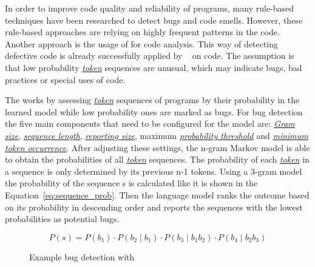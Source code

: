 In order to improve code quality and reliability of programs, many rule-based techniques have been researched to detect bugs and code smells. However, these rule-based approaches are relying on highly frequent patterns in the code. Another approach is the usage of  for code analysis. This way of detecting defective code is already successfully applied by \bugram{}~\cite{bugram} on \java{} code. The assumption is that low probability \hyperref[def:token]{\textit{token}} sequences are unusual, which may indicate bugs, bad practices or special uses of code. 

The \ngram{} works by assessing \hyperref[def:token]{\textit{token}} sequences of programs by their probability in the learned model while low probability ones are marked as bugs. For bug detection the five main components that need to be configured for the model are: \hyperref[def:gram_size]{\textit{Gram size}}, \hyperref[def:sequence_length]{\textit{sequence length}}, \hyperref[def:reporting_size]{\textit{reporting size}}, maximum \hyperref[def:probability_threshold]{\textit{probability threshold}} and \hyperref[def:minimum_token_occurrence]{\textit{minimum token occurrence}}. After adjusting these settings, the n-gram Markov model is able to obtain the probabilities of all \hyperref[def:token]{\textit{token}} sequences. The probability of each \hyperref[def:token]{\textit{token}} in a sequence is only determined by its previous n-1 tokens. Using a 3-gram model the probability of the sequence s is calculated like it is shown in the Equation~\ref{eq:sequence_prob}. Then the language model ranks the outcome based on its probability in descending order and reports the sequences with the lowest probabilities as potential bugs. 
 
\begin{equation} \label{eq:sequence_prob}
P(s) ={} P(b_{1})\cdot P(b_{2}\mid b_{1})\cdot P(b_{3}\mid b_{1}b_{2})\cdot P(b_{4}\mid b_{2}b_{3})
\end{equation}

\begin{figure}%
    \centering
    \qquad
    \caption[Example bug detection with \ngram{}]{\label{fig:exampleTokens}Example bug detection with \ngram{}}%
\end{figure}

